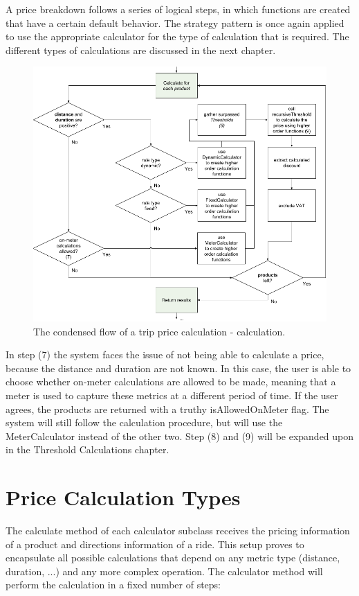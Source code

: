 A price breakdown follows a series of logical steps, in which functions are created that have a certain default behavior. The strategy pattern is once again applied to use the appropriate calculator for the type of calculation that is required. The different types of calculations are discussed in the next chapter.

\begin{figure}[H]
	\centering
	\includegraphics[width=.8\textwidth]{Calculation}
	\caption[Calculation]{The condensed flow of a trip price calculation - calculation.}
	\label{fig:Calculation}
\end{figure}

In step (7) the system faces the issue of not being able to calculate a price, because the distance and duration are not known. In this case, the user is able to choose whether on-meter calculations are allowed to be made, meaning that a meter is used to capture these metrics at a different period of time. If the user agrees, the products are returned with a truthy isAllowedOnMeter flag. The system will still follow the calculation procedure, but will use the MeterCalculator instead of the other two. Step (8) and (9) will be expanded upon in the Threshold Calculations chapter.

\section{Price Calculation Types}
The calculate method of each calculator subclass receives the pricing information of a product and directions information of a ride. This setup proves to encapsulate all possible calculations that depend on any metric type (distance, duration, ...) and any more complex operation. The calculator method will perform the calculation in a fixed number of steps:

